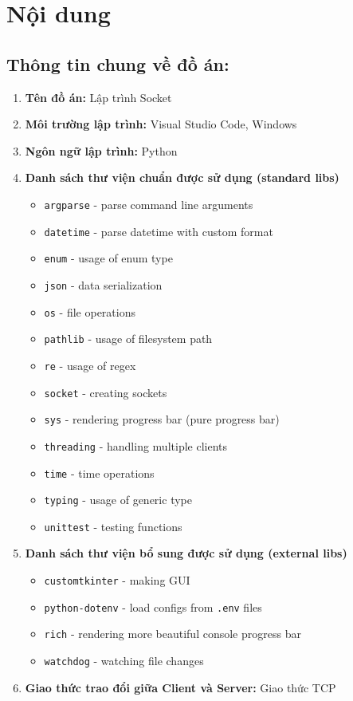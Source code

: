 \documentclass[a4paper,12pt]{report}
\begin{document}
\pagebreak
\section{Nội dung}
\subsection{Thông tin chung về đồ án:}
\begin{enumerate}
  \item \textbf{Tên đồ án:} Lập trình Socket
  \item \textbf{Môi trường lập trình:} Visual Studio Code, Windows
  \item \textbf{Ngôn ngữ lập trình:} Python
  \item \textbf{Danh sách thư viện chuẩn được sử dụng (standard libs)}
        \begin{itemize}
          \item \verb|argparse| - parse command line arguments
          \item \verb|datetime| - parse datetime with custom format
          \item \verb|enum| - usage of enum type
          \item \verb|json| - data serialization
          \item \verb|os| - file operations
          \item \verb|pathlib| - usage of filesystem path
          \item \verb|re| - usage of regex
          \item \verb|socket| - creating sockets
          \item \verb|sys| - rendering progress bar (pure progress bar)
          \item \verb|threading| - handling multiple clients
          \item \verb|time| - time operations
          \item \verb|typing| - usage of generic type
          \item \verb|unittest| - testing functions
        \end{itemize}
  \item \textbf{Danh sách thư viện bổ sung được sử dụng (external libs)}
        \begin{itemize}
          \item \verb|customtkinter| - making GUI
          \item \verb|python-dotenv| - load configs from \verb|.env| files
          \item \verb|rich| - rendering more beautiful console progress bar
          \item \verb|watchdog| - watching file changes
        \end{itemize}
  \item  \textbf{Giao thức trao đổi giữa Client và Server:} Giao thức TCP
\end{enumerate}
\end{document}
